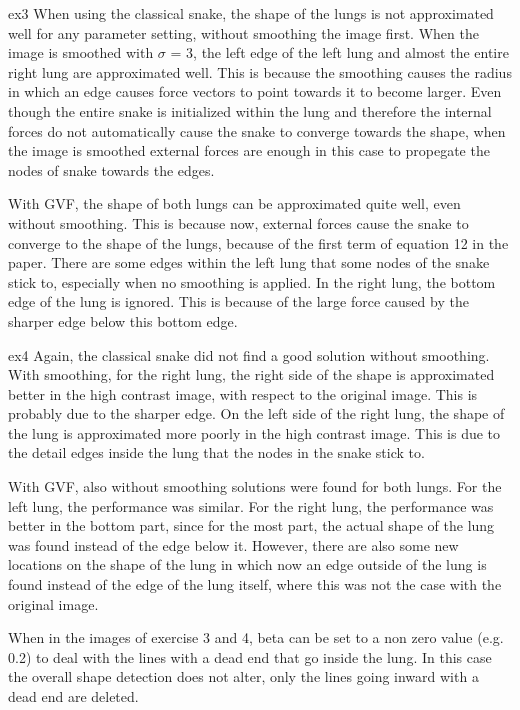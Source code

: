 ex3
When using the classical snake, the shape of the lungs is not approximated well for any parameter setting, without smoothing the image first. When the image is smoothed with $\sigma$ = 3, the left edge of the left lung and almost the entire right lung are approximated well. This is because the smoothing causes the radius in which an edge causes force vectors to point towards it to become larger. Even though the entire snake is initialized within the lung and therefore the internal forces do not automatically cause the snake to converge towards the shape, when the image is smoothed external forces are enough in this case to propegate the nodes of snake towards the edges.

With GVF, the shape of both lungs can be approximated quite well, even without smoothing. This is because now, external forces cause the snake to converge to the shape of the lungs, because of the first term of equation 12 in the paper. There are some edges within the left lung that some nodes of the snake stick to, especially when no smoothing is applied. In the right lung, the bottom edge of the lung is ignored. This is because of the large force caused by the sharper edge below this bottom edge.


ex4
Again, the classical snake did not find a good solution without smoothing. With smoothing, for the right lung, the right side of the shape is approximated better in the high contrast image, with respect to the original image. This is probably due to the sharper edge. On the left side of the right lung, the shape of the lung is approximated more poorly in the high contrast image. This is due to the detail edges inside the lung that the nodes in the snake stick to.

With GVF, also without smoothing solutions were found for both lungs. For the left lung, the performance was similar. For the right lung, the performance was better in the bottom part, since for the most part, the actual shape of the lung was found instead of the edge below it. However, there are also some new locations on the shape of the lung in which now an edge outside of the lung is found instead of the edge of the lung itself, where this was not the case with the original image.

When in the images of exercise 3 and 4, beta can be set to a non zero value (e.g. 0.2) to deal with the lines with a dead end that go inside the lung. In this case the overall shape detection does not alter, only the lines going inward with a dead end are deleted.

